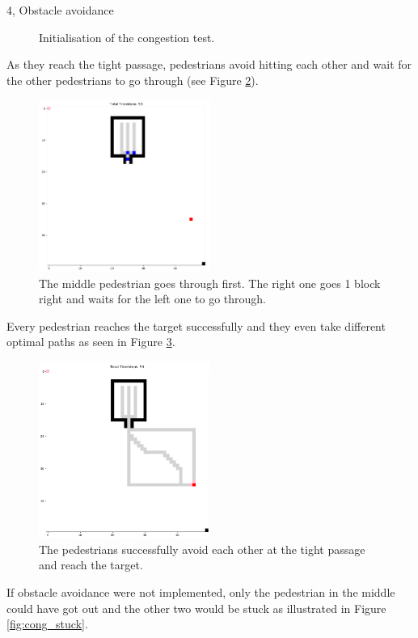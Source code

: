 \documentclass[10pt,a4paper]{article}
\begin{document}
\begin{task}{4, Obstacle avoidance}
\begin{figure}[H]
    \caption{Initialisation of the congestion test.}
    \label{fig:cong_start}
\end{figure}
As they reach the tight passage, pedestrians avoid hitting each other and wait for the other pedestrians to go through (see Figure \ref{fig:cong_mid}). 
\begin{figure}[H]
    \centering
    \includegraphics[width=0.5\textwidth]{pictures/mid_task4_cong.PNG}
    \caption{The middle pedestrian goes through first. The right one goes 1 block right and waits for the left one to go through.}
    \label{fig:cong_mid}
\end{figure}
Every pedestrian reaches the target successfully and they even take different optimal paths as seen in Figure \ref{fig:cong_end}. \\
\begin{figure}[H]
    \centering
    \includegraphics[width=0.5\textwidth]{pictures/end_task4_cong.PNG}
    \caption{The pedestrians successfully avoid each other at the tight passage and reach the target.}
    \label{fig:cong_end}
\end{figure}
If obstacle avoidance were not implemented, only the pedestrian in the middle could have got out and the other two would be stuck as illustrated in Figure \ref{fig:cong_stuck}. \\

\end{task}
\end{document}
